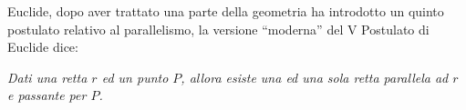 \begin{comment}
 

Assumendo dunque questa come definizione di parallelismo, abbiamo 
bisogno di precisare il concetto di distanza.
Dati due punti \(P\) e \(Q\), la \emph{distanza} tra \(P\) e \(Q\) è la 
lunghezza del \emph{percorso più breve} che unisce i due punti. 
Questo concetto è valido anche se si riferisce alle distanze tra due 
città che si trovano negli stradari: sono riportate le lunghezze dei 
percorsi minimi tra tutte le strade alternative che collegano due 
città. Naturalmente, nel piano, ove si ``dispone'' di tutti i punti 
da poter ``attraversare'', il percorso più breve che collega due 
punti \(P\) e \(Q\) è il segmento \(PQ\); quindi nella geometria euclidea 
assumiamo come distanza tra due punti la lunghezza del segmento 
avente per estremi i due punti.

Se vogliamo parlare di distanza tra due insiemi di punti, allora va 
considerato il percorso più breve tra tutti i percorsi che collegano 
un qualsiasi punto del primo insieme con un qualsiasi punto del 
secondo: in pratica la distanza è la lunghezza del più piccolo 
segmento tra tutti quelli che collegano i due insiemi di punti. 

Nel caso particolare di un punto \(A\) ed una retta \(BC\), se il punto 
appartiene alla retta allora la distanza di \(A\) da \(BC\) è uguale a 
zero, altrimenti si considera come distanza la lunghezza del segmento 
\(AH\), dove \(H\) è il punto in cui la perpendicolare a \(BC\) passante 
per \(A\) interseca la stessa retta \(BC\): il motivo si intuisce in base 
a quanto detto, ma risulterà chiaro più avanti, quando affronteremo 
lo studio delle disuguaglianze tra gli elementi di un triangolo. 

Analogamente, come distanza tra due rette parallele si assume la 
lunghezza di un qualunque segmento che unisce il punto di una delle 
due rette con il piede della perpendicolare mandata da esso 
sull'altra retta. Affermare che tali segmenti sono tutti congruenti è 
un modo più preciso per dire che le due rette mantengono sempre la 
stessa distanza.
\end{comment}

Euclide, dopo aver trattato una parte della geometria ha introdotto un 
quinto postulato relativo al parallelismo, la versione 
``moderna'' del V Postulato di Euclide dice: 

\begin{postulato}
\emph{Dati una retta \(r\) ed un punto \(P\), allora esiste una ed una 
  sola retta parallela ad \(r\) e passante per \(P\).}
\end{postulato}

